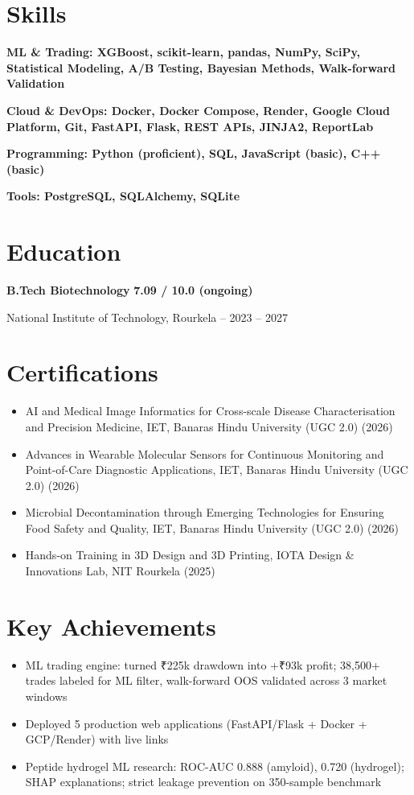 \documentclass[11pt,a4paper]{article}
\begin{document}
\section*{Skills}
\noindent\textbf{ML \& Trading: XGBoost, scikit-learn, pandas, NumPy, SciPy, Statistical Modeling, A/B Testing, Bayesian Methods, Walk-forward Validation}

\noindent\textbf{Cloud \& DevOps: Docker, Docker Compose, Render, Google Cloud Platform, Git, FastAPI, Flask, REST APIs, JINJA2, ReportLab}

\noindent\textbf{Programming: Python (proficient), SQL, JavaScript (basic), C++ (basic)}

\noindent\textbf{Tools: PostgreSQL, SQLAlchemy, SQLite}

\section*{Education}
\noindent\textbf{B.Tech Biotechnology} \hfill \textbf{7.09 / 10.0 (ongoing)}

\noindent National Institute of Technology, Rourkela -- 2023 – 2027

\section*{Certifications}
\begin{itemize}
    \item AI and Medical Image Informatics for Cross-scale Disease Characterisation and Precision Medicine, IET, Banaras Hindu University (UGC 2.0) (2026)
    \item Advances in Wearable Molecular Sensors for Continuous Monitoring and Point-of-Care Diagnostic Applications, IET, Banaras Hindu University (UGC 2.0) (2026)
    \item Microbial Decontamination through Emerging Technologies for Ensuring Food Safety and Quality, IET, Banaras Hindu University (UGC 2.0) (2026)
    \item Hands-on Training in 3D Design and 3D Printing, IOTA Design \& Innovations Lab, NIT Rourkela (2025)
\end{itemize}

\section*{Key Achievements}
\begin{itemize}
    \item ML trading engine: turned ₹225k drawdown into +₹93k profit; 38,500+ trades labeled for ML filter, walk-forward OOS validated across 3 market windows
    \item Deployed 5 production web applications (FastAPI/Flask + Docker + GCP/Render) with live links
    \item Peptide hydrogel ML research: ROC-AUC 0.888 (amyloid), 0.720 (hydrogel); SHAP explanations; strict leakage prevention on 350-sample benchmark
\end{itemize}
\end{document}
